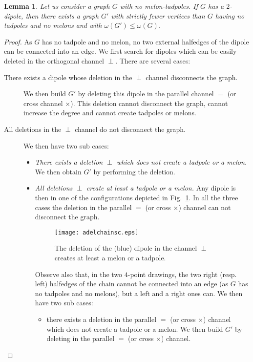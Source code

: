 \documentclass[10pt]{article}
\theoremstyle{plain}
\newtheorem{lemma}{Lemma}
\theoremstyle{definition}
\begin{document}
\begin{lemma}\label{lem:dipole}
Let us consider a graph $G$ with no melon-tadpoles. If $G$ has a $2$-dipole, then there exists a graph $G'$ with strictly fewer vertices than $G$ having no tadpoles and no melons and
with $\omega(G') \le \omega(G)$.
\end{lemma}
\begin{proof} As $G$ has no tadpole and no melon, no two external halfedges of the dipole can be connected into an edge.
We first search for dipoles which can be easily deleted in the orthogonal channel $\perp$. There are several cases:
\begin{description}
 \item[There exists a dipole whose deletion in the $\perp$ channel disconnects the graph.] We then build $G'$ by deleting this dipole in the parallel channel $=$ (or cross channel $\times$). 
 This deletion cannot disconnect the graph, cannot increase the degree and cannot create tadpoles or melons.
 \item[All deletions in the $\perp$ channel do not disconnect the graph.] We then have two sub cases:
 \begin{itemize}
  \item{\it There exists a deletion $\perp$ which does not create a tadpole or a melon.} We then obtain $G'$ by performing the deletion.
    \item{\it All deletions $\perp$ create at least a tadpole or a melon.} Any dipole is then in one of the configurations depicted in Fig.~\ref{fig:adelchains}. 
    In all the three cases the deletion in the parallel $=$ (or cross $\times$) channel can not disconnect the graph.
 \begin{figure}[htb]
 \begin{center}
 \texttt{[image: adelchainsc.eps]}  
 \caption{The deletion of the (blue) dipole in the channel $\perp$ creates at least a melon or a tadpole.} \label{fig:adelchains}
 \end{center}
 \end{figure}
 Observe also that, in the two $4$-point drawings, the two right (resp. left) halfedges of the chain cannot be connected into an edge (as $G$ has no tadpoles and no melons), but a left and a right ones can. We then have two sub cases:
 \begin{itemize}
    \item there exists a deletion in  the parallel $=$ (or cross $\times$) channel which does not create a tadpole or a melon. We then build $G'$ by deleting in the parallel $=$ (or cross $\times$) channel.

\end{itemize}
\end{itemize}
\end{description}
\end{proof}
\end{document}
